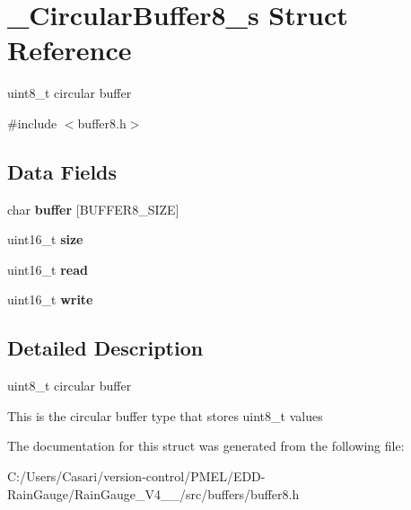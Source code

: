 \hypertarget{struct___circular_buffer8__s}{}\section{\+\_\+\+Circular\+Buffer8\+\_\+s Struct Reference}
\label{struct___circular_buffer8__s}


uint8\+\_\+t circular buffer  




{\ttfamily \#include $<$buffer8.\+h$>$}

\subsection*{Data Fields}
\begin{DoxyCompactItemize}
\item 
\hypertarget{struct___circular_buffer8__s_a1c29e41b2615144aa07e623c6890ab72}{}char {\bfseries buffer} \mbox{[}B\+U\+F\+F\+E\+R8\+\_\+\+S\+I\+Z\+E\mbox{]}\label{struct___circular_buffer8__s_a1c29e41b2615144aa07e623c6890ab72}

\item 
\hypertarget{struct___circular_buffer8__s_aaba88b24a21a6c70c895c0d55f4a69a0}{}uint16\+\_\+t {\bfseries size}\label{struct___circular_buffer8__s_aaba88b24a21a6c70c895c0d55f4a69a0}

\item 
\hypertarget{struct___circular_buffer8__s_a17fc9132ed0f45e5ef7a59e6a93abeb0}{}uint16\+\_\+t {\bfseries read}\label{struct___circular_buffer8__s_a17fc9132ed0f45e5ef7a59e6a93abeb0}

\item 
\hypertarget{struct___circular_buffer8__s_abac7c895b71c1b4d5b21beabca7ea63c}{}uint16\+\_\+t {\bfseries write}\label{struct___circular_buffer8__s_abac7c895b71c1b4d5b21beabca7ea63c}

\end{DoxyCompactItemize}


\subsection{Detailed Description}
uint8\+\_\+t circular buffer 

This is the circular buffer type that stores uint8\+\_\+t values 

The documentation for this struct was generated from the following file\+:\begin{DoxyCompactItemize}
\item 
C\+:/\+Users/\+Casari/version-\/control/\+P\+M\+E\+L/\+E\+D\+D-\/\+Rain\+Gauge/\+Rain\+Gauge\+\_\+\+V4\+\_\+\_/src/buffers/buffer8.\+h\end{DoxyCompactItemize}
